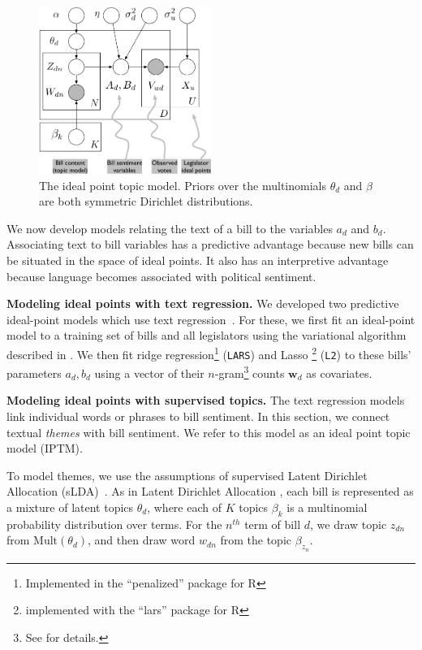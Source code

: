 \begin{figure}[t]
\center
\includegraphics[width=0.5\textwidth]{chapter_spatial_voting_with_text/figures/ideal-point-topic-model.pdf}
\caption{The ideal point topic model.  Priors over the multinomials
$\theta_d$ and $\beta$ are both symmetric Dirichlet distributions.}
\label{fig:legis_gm}
\end{figure}

We now develop models relating the text of a bill to the variables
$a_d$ and $b_d$.  Associating text to bill variables has a predictive
advantage because new bills can be situated in the space of ideal
points.  It also has an interpretive advantage because language
becomes associated with political sentiment.

\textbf{Modeling ideal points with text regression.} We developed two
predictive ideal-point models which use text
regression~\citep{kogan:2009}.  For these, we first fit an ideal-point
model to a training set of bills and all legislators using the
variational algorithm described in .  We then fit ridge
regression\footnote{Implemented in the ``penalized'' package for R}
(\verb!LARS!) and Lasso
\footnote{implemented with the ``lars'' package for R} (\verb!L2!) to
these bills' parameters $a_d, b_d$ using a vector of their
$n$-gram\footnote{See  for details.}  counts $\bm
w_{d}$ as covariates.

\textbf{Modeling ideal points with supervised topics.} The text
regression models link individual words or phrases to bill sentiment.
In this section, we connect textual \emph{themes} with bill sentiment.
We refer to this model as an ideal point topic model (IPTM).

To model themes, we use the assumptions of supervised Latent Dirichlet
Allocation (sLDA)~\citep{blei:2008}.  As in Latent Dirichlet Allocation
\citep{blei:2003}, each bill is represented as a mixture of latent
topics $\theta_d$, where each of $K$ topics $\beta_k$ is a multinomial
probability distribution over terms.  For the $n^{th}$ term of bill
$d$, we draw topic $z_{dn}$ from $\mbox{Mult}(\theta_d)$, and then
draw word $w_{dn}$ from the topic $\beta_{z_n}$.


